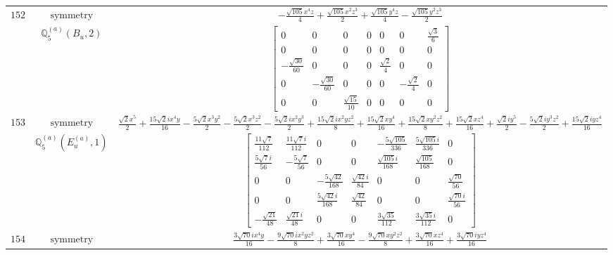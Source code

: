 \documentclass[fleqn,8pt,landscape]{jsarticle}
\begin{document}
\begin{longtable}{ccc}
$ 152 $ & $ \text{symmetry} $ & $ - \frac{\sqrt{105} x^{4} z}{4} + \frac{\sqrt{105} x^{2} z^{3}}{2} + \frac{\sqrt{105} y^{4} z}{4} - \frac{\sqrt{105} y^{2} z^{3}}{2} $ \\
$  $ & $ \mathbb{Q}_{5}^{(a)}(B_{u},2) $ & $ \begin{bmatrix} 0 & 0 & 0 & 0 & 0 & 0 & \frac{\sqrt{3}}{6} \\ 0 & 0 & 0 & 0 & 0 & 0 & 0 \\ - \frac{\sqrt{30}}{60} & 0 & 0 & 0 & \frac{\sqrt{2}}{4} & 0 & 0 \\ 0 & - \frac{\sqrt{30}}{60} & 0 & 0 & 0 & - \frac{\sqrt{2}}{4} & 0 \\ 0 & 0 & \frac{\sqrt{15}}{10} & 0 & 0 & 0 & 0 \end{bmatrix} $ \\ \hline
$ 153 $ & $ \text{symmetry} $ & $ \frac{\sqrt{2} x^{5}}{2} + \frac{15 \sqrt{2} i x^{4} y}{16} - \frac{5 \sqrt{2} x^{3} y^{2}}{2} - \frac{5 \sqrt{2} x^{3} z^{2}}{2} - \frac{5 \sqrt{2} i x^{2} y^{3}}{2} + \frac{15 \sqrt{2} i x^{2} y z^{2}}{8} + \frac{15 \sqrt{2} x y^{4}}{16} + \frac{15 \sqrt{2} x y^{2} z^{2}}{8} + \frac{15 \sqrt{2} x z^{4}}{16} + \frac{\sqrt{2} i y^{5}}{2} - \frac{5 \sqrt{2} i y^{3} z^{2}}{2} + \frac{15 \sqrt{2} i y z^{4}}{16} $ \\
$  $ & $ \mathbb{Q}_{5}^{(a)}(E_{u}^{(a)},1) $ & $ \begin{bmatrix} \frac{11 \sqrt{7}}{112} & \frac{11 \sqrt{7} i}{112} & 0 & 0 & - \frac{5 \sqrt{105}}{336} & \frac{5 \sqrt{105} i}{336} & 0 \\ \frac{5 \sqrt{7} i}{56} & - \frac{5 \sqrt{7}}{56} & 0 & 0 & \frac{\sqrt{105} i}{168} & \frac{\sqrt{105}}{168} & 0 \\ 0 & 0 & - \frac{5 \sqrt{42}}{168} & \frac{\sqrt{42} i}{84} & 0 & 0 & \frac{\sqrt{70}}{56} \\ 0 & 0 & \frac{5 \sqrt{42} i}{168} & \frac{\sqrt{42}}{84} & 0 & 0 & \frac{\sqrt{70} i}{56} \\ - \frac{\sqrt{21}}{48} & \frac{\sqrt{21} i}{48} & 0 & 0 & \frac{3 \sqrt{35}}{112} & \frac{3 \sqrt{35} i}{112} & 0 \end{bmatrix} $ \\ \hline
$ 154 $ & $ \text{symmetry} $ & $ \frac{3 \sqrt{70} i x^{4} y}{16} - \frac{9 \sqrt{70} i x^{2} y z^{2}}{8} + \frac{3 \sqrt{70} x y^{4}}{16} - \frac{9 \sqrt{70} x y^{2} z^{2}}{8} + \frac{3 \sqrt{70} x z^{4}}{16} + \frac{3 \sqrt{70} i y z^{4}}{16} $ \\

\end{longtable}
\end{document}
